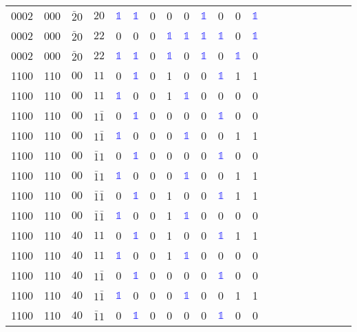 \begin{longtable*}{c| cccccccccccccccccccc }
0002& 000& $\bar{2}0$& $20$& \textcolor{blue}{$\mathds{1}$}& \textcolor{blue}{$\mathds{1}$}& 0& 0& 0& \textcolor{blue}{$\mathds{1}$}& 0& 0& \textcolor{blue}{$\mathds{1}$}\\
0002& 000& $\bar{2}0$& $22$& 0& 0& 0& \textcolor{blue}{$\mathds{1}$}& \textcolor{blue}{$\mathds{1}$}& \textcolor{blue}{$\mathds{1}$}& \textcolor{blue}{$\mathds{1}$}& 0& \textcolor{blue}{$\mathds{1}$}\\
0002& 000& $\bar{2}0$& $22$& \textcolor{blue}{$\mathds{1}$}& \textcolor{blue}{$\mathds{1}$}& 0& \textcolor{blue}{$\mathds{1}$}& 0& \textcolor{blue}{$\mathds{1}$}& 0& \textcolor{blue}{$\mathds{1}$}& 0\\
1100& 110& $00$& $11$& 0& \textcolor{blue}{$\mathds{1}$}& 0& 1& 0& 0& \textcolor{blue}{$\mathds{1}$}& 1& 1\\
1100& 110& $00$& $11$& \textcolor{blue}{$\mathds{1}$}& 0& 0& 1& \textcolor{blue}{$\mathds{1}$}& 0& 0& 0& 0\\
1100& 110& $00$& $1\bar{1}$& 0& \textcolor{blue}{$\mathds{1}$}& 0& 0& 0& 0& \textcolor{blue}{$\mathds{1}$}& 0& 0\\
1100& 110& $00$& $1\bar{1}$& \textcolor{blue}{$\mathds{1}$}& 0& 0& 0& \textcolor{blue}{$\mathds{1}$}& 0& 0& 1& 1\\
1100& 110& $00$& $\bar{1}1$& 0& \textcolor{blue}{$\mathds{1}$}& 0& 0& 0& 0& \textcolor{blue}{$\mathds{1}$}& 0& 0\\
1100& 110& $00$& $\bar{1}1$& \textcolor{blue}{$\mathds{1}$}& 0& 0& 0& \textcolor{blue}{$\mathds{1}$}& 0& 0& 1& 1\\
1100& 110& $00$& $\bar{1}\bar{1}$& 0& \textcolor{blue}{$\mathds{1}$}& 0& 1& 0& 0& \textcolor{blue}{$\mathds{1}$}& 1& 1\\
1100& 110& $00$& $\bar{1}\bar{1}$& \textcolor{blue}{$\mathds{1}$}& 0& 0& 1& \textcolor{blue}{$\mathds{1}$}& 0& 0& 0& 0\\
1100& 110& $40$& $11$& 0& \textcolor{blue}{$\mathds{1}$}& 0& 1& 0& 0& \textcolor{blue}{$\mathds{1}$}& 1& 1\\
1100& 110& $40$& $11$& \textcolor{blue}{$\mathds{1}$}& 0& 0& 1& \textcolor{blue}{$\mathds{1}$}& 0& 0& 0& 0\\
1100& 110& $40$& $1\bar{1}$& 0& \textcolor{blue}{$\mathds{1}$}& 0& 0& 0& 0& \textcolor{blue}{$\mathds{1}$}& 0& 0\\
1100& 110& $40$& $1\bar{1}$& \textcolor{blue}{$\mathds{1}$}& 0& 0& 0& \textcolor{blue}{$\mathds{1}$}& 0& 0& 1& 1\\
1100& 110& $40$& $\bar{1}1$& 0& \textcolor{blue}{$\mathds{1}$}& 0& 0& 0& 0& \textcolor{blue}{$\mathds{1}$}& 0& 0\\

\end{longtable*}
